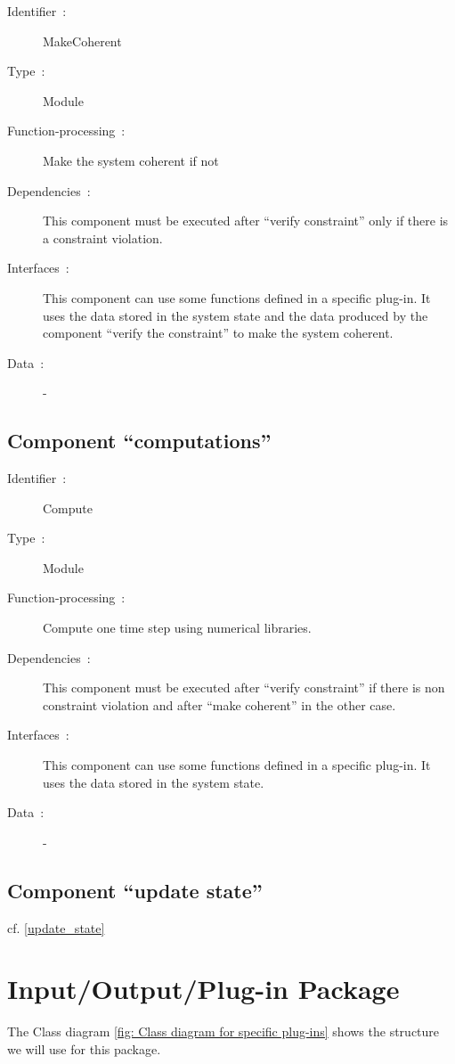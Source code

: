 		\begin{description}
	
		\item[Identifier~:]MakeCoherent
		\item[Type~:]Module
		\item[Function-processing~:]Make the system coherent if not
		\item[Dependencies~:]This component must be executed after ``verify constraint'' only if there is a constraint violation.
		\item[Interfaces~:]This component can use some functions defined in a specific plug-in. It uses the data stored in the system state and the data produced by the component ``verify the constraint'' to make the system coherent.
		\item[Data~:]-

	\end{description}
	
  	\subsection{Component ``computations''}\label{computations}
	
		\begin{description}
	
		\item[Identifier~:]Compute
		\item[Type~:]Module
		\item[Function-processing~:]Compute one time step using numerical libraries.
		\item[Dependencies~:]This component must be executed after ``verify constraint'' if there is non constraint violation and after ``make coherent'' in the other case.
		\item[Interfaces~:]This component can use some functions defined in a specific plug-in. It uses the data stored in the system state.
		\item[Data~:]-

		\end{description}
	
	\subsection{Component ``update state''} 
	cf. \ref{update_state}\\
	
	

\section{Input/Output/Plug-in Package}
	The Class diagram \ref{fig: Class diagram for specific plug-ins} shows the structure we will use for this package.
	
